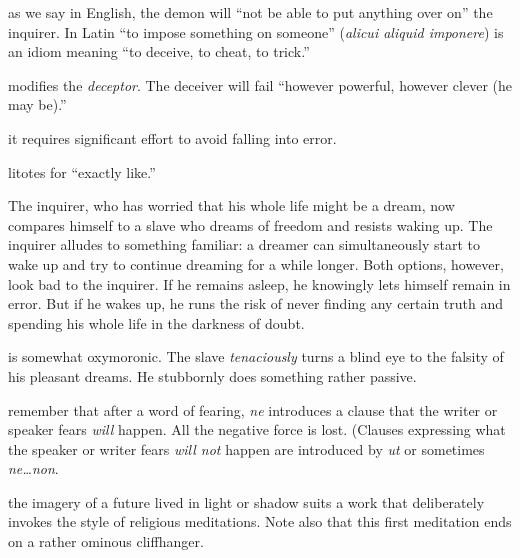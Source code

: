  as we say in English, the demon will ``not be able to put anything over on'' the inquirer. In Latin ``to impose something on someone'' (\textit{alicui aliquid imponere}) is an idiom meaning ``to deceive, to cheat, to trick.''

 modifies the \textit{deceptor}. The deceiver will fail ``however powerful, however clever (he may be).''

 it requires significant effort to avoid falling into error.

 litotes for ``exactly like.''

 The inquirer, who has worried that his whole life might be a dream, now compares himself to a slave who dreams of freedom and resists waking up. The inquirer alludes to something familiar: a dreamer can simultaneously start to wake up and try to continue dreaming for a while longer. Both options, however, look bad to the inquirer. If he remains asleep, he knowingly lets himself remain in error. But if he wakes up, he runs the risk of never finding any certain truth and spending his whole life in the darkness of doubt.

 is somewhat oxymoronic. The slave \textit{tenaciously} turns a blind eye to the falsity of his pleasant dreams. He stubbornly does something rather passive.

 remember that after a word of fearing, \textit{ne} introduces a clause that the writer or speaker fears \textit{will} happen. All the negative force is lost. (Clauses expressing what the speaker or writer fears \textit{will not} happen are introduced by \textit{ut} or sometimes \textit{ne\dots non}.

 the imagery of a future lived in light or shadow suits a work that deliberately invokes the style of religious meditations. Note also that this first meditation ends on a rather ominous cliffhanger.


